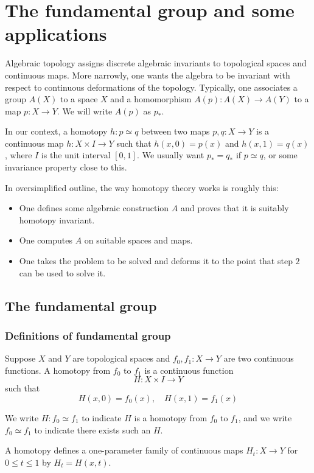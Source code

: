 \chapter{The fundamental group and some applications}
Algebraic topology assigns discrete algebraic invariants to topological spaces and continuous maps. More narrowly, one wants the algebra to be invariant with respect to continuous deformations of the topology. Typically, one associates a group $A(X)$ to a space $X$ and a homomorphism $A(p):A(X)\to A(Y)$ to a map $p:X\to Y$. We will write $A(p)$ as $p_*$.\par
In our context, a homotopy $h:p\simeq q$ between two maps $p,q:X\to Y$ is a continuous map $h:X\times I\to Y$ such that $h(x,0)=p(x)$ and $h(x,1)=q(x)$, where $I$ is the unit interval $[0,1]$. We usually want $p_*=q_*$ if $p\simeq q$, or some invariance property close to this.\par
In oversimplified outline, the way homotopy theory works is roughly this:
\begin{itemize}
\item One defines some algebraic construction $A$ and proves that it is suitably homotopy invariant.
\item One computes $A$ on suitable spaces and maps.
\item One takes the problem to be solved and deforms it to the point that step $2$ can be used to solve it.
\end{itemize}

\section{The fundamental group}
\subsection{Definitions of fundamental group}
\begin{definition}
Suppose $X$ and $Y$ are topological spaces and $f_0,f_1:X\to Y$ are two continuous functions. A homotopy from $f_0$ to $f_1$ is a continuous function
\[H:X\times I\to Y\]
such that
\[H(x,0)=f_0(x),\quad H(x,1)=f_1(x)\]
\end{definition}

We write $H:f_0\simeq f_1$ to indicate $H$ is a homotopy from $f_0$ to $f_1$, and we write $f_0\simeq f_1$ to indicate there exists such an $H$.\par

A homotopy defines a one-parameter family of continuous maps $H_t:X\to Y$ for $0\leq t\leq1$ by $H_t=H(x,t)$.

